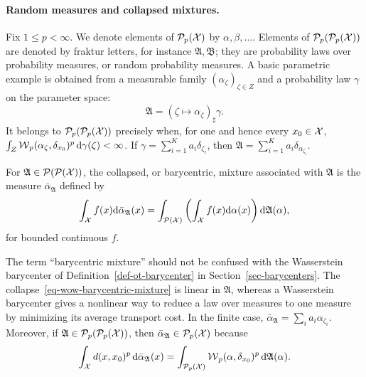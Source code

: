 \paragraph{Random measures and collapsed mixtures.}
Fix $1\leq p<\infty$. We denote elements of $\mathcal{P}_p(\mathcal{X})$ by $\alpha,\beta,\ldots$. Elements of $\mathcal{P}_p(\mathcal{P}_p(\mathcal{X}))$ are denoted by fraktur letters, for instance $\mathfrak A,\mathfrak B$; they are probability laws over probability measures, or random probability measures. A basic parametric example is obtained from a measurable family $(\alpha_\zeta)_{\zeta\in Z}$ and a probability law $\gamma$ on the parameter space:
\begin{equation}\label{eq-wow-parametric-law}
	\mathfrak A=(\zeta\mapsto\alpha_\zeta)_\sharp\gamma.
\end{equation}
It belongs to $\mathcal{P}_p(\mathcal{P}_p(\mathcal{X}))$ precisely when, for one and hence every $x_0\in\mathcal{X}$,
$\int_Z \operatorname{\mathcal{W}}_p(\alpha_\zeta,\delta_{x_0})^p\,\mathrm{d}\gamma(\zeta)<\infty$.
If $\gamma=\sum_{i=1}^K a_i\delta_{\zeta_i}$, then
$\mathfrak A=\sum_{i=1}^K a_i\delta_{\alpha_{\zeta_i}}$.
\begin{defn}\label{def-collapsed-barycentric-mixture}
	For $\mathfrak A\in\mathcal{P}(\mathcal{P}(\mathcal{X}))$, the collapsed, or barycentric, mixture associated with $\mathfrak A$ is the measure $\bar\alpha_{\mathfrak A}$ defined by
	\begin{equation}\label{eq-wow-barycentric-mixture}
		\int_{\mathcal{X}} f(x)\mathrm{d}\bar\alpha_{\mathfrak A}(x)
		=
		\int_{\mathcal{P}(\mathcal{X})}
		\left(\int_{\mathcal{X}} f(x)\mathrm{d}\alpha(x)\right)
		\mathrm{d}\mathfrak A(\alpha),
	\end{equation}
	for bounded continuous $f$.
\end{defn}
The term ``barycentric mixture'' should not be confused with the Wasserstein barycenter of Definition~\ref{def-ot-barycenter} in Section~\ref{sec-barycenters}. The collapse~\eqref{eq-wow-barycentric-mixture} is linear in $\mathfrak A$, whereas a Wasserstein barycenter gives a nonlinear way to reduce a law over measures to one measure by minimizing its average transport cost.
In the finite case, $\bar\alpha_{\mathfrak A}=\sum_i a_i\alpha_{\zeta_i}$. Moreover, if $\mathfrak A\in\mathcal{P}_p(\mathcal{P}_p(\mathcal{X}))$, then $\bar\alpha_{\mathfrak A}\in\mathcal{P}_p(\mathcal{X})$ because
\[
	\int_{\mathcal{X}} d(x,x_0)^p\,\mathrm{d}\bar\alpha_{\mathfrak A}(x)
	=
	\int_{\mathcal{P}_p(\mathcal{X})}\operatorname{\mathcal{W}}_p(\alpha,\delta_{x_0})^p\,\mathrm{d}\mathfrak A(\alpha).
\]


